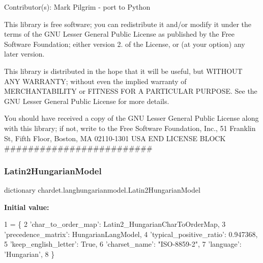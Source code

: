 Contributor(s)\+: Mark Pilgrim -\/ port to Python

This library is free software; you can redistribute it and/or modify it under the terms of the G\+NU Lesser General Public License as published by the Free Software Foundation; either version 2. of the License, or (at your option) any later version.

This library is distributed in the hope that it will be useful, but W\+I\+T\+H\+O\+UT A\+NY W\+A\+R\+R\+A\+N\+TY; without even the implied warranty of M\+E\+R\+C\+H\+A\+N\+T\+A\+B\+I\+L\+I\+TY or F\+I\+T\+N\+E\+SS F\+OR A P\+A\+R\+T\+I\+C\+U\+L\+AR P\+U\+R\+P\+O\+SE. See the G\+NU Lesser General Public License for more details.

You should have received a copy of the G\+NU Lesser General Public License along with this library; if not, write to the Free Software Foundation, Inc., 51 Franklin St, Fifth Floor, Boston, MA 02110-\/1301 U\+SA E\+ND L\+I\+C\+E\+N\+SE B\+L\+O\+CK \#\#\#\#\#\#\#\#\#\#\#\#\#\#\#\#\#\#\#\#\#\#\#\#\# \mbox{\label{namespacechardet_1_1langhungarianmodel_ade62a37e04f7d870c176ea1c17f409b3}} 
\subsubsection{\texorpdfstring{Latin2\+Hungarian\+Model}{Latin2HungarianModel}}
{\footnotesize\ttfamily dictionary chardet.\+langhungarianmodel.\+Latin2\+Hungarian\+Model}

{\bfseries Initial value\+:}
\begin{DoxyCode}
1 =  \{
2   \textcolor{stringliteral}{'char\_to\_order\_map'}: Latin2\_HungarianCharToOrderMap,
3   \textcolor{stringliteral}{'precedence\_matrix'}: HungarianLangModel,
4   \textcolor{stringliteral}{'typical\_positive\_ratio'}: 0.947368,
5   \textcolor{stringliteral}{'keep\_english\_letter'}: \textcolor{keyword}{True},
6   \textcolor{stringliteral}{'charset\_name'}: \textcolor{stringliteral}{"ISO-8859-2"},
7   \textcolor{stringliteral}{'language'}: \textcolor{stringliteral}{'Hungarian'},
8 \}
\end{DoxyCode}
\mbox{\label{namespacechardet_1_1langhungarianmodel_a8f84a038bf7814667746dccc80666d4e}} 
